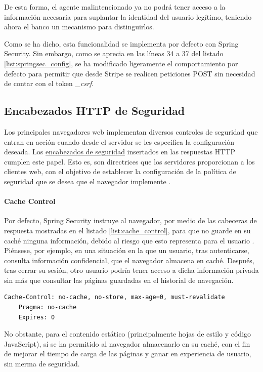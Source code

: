\documentclass[a4paper,12pt,twoside,openright]{report}
\begin{document}
	De esta forma, el agente malintencionado ya no podrá tener acceso a la información necesaria para suplantar la identidad del usuario legítimo, teniendo ahora el banco un mecanismo para distinguirlos.
	
	Como se ha dicho, esta funcionalidad se implementa por defecto con Spring Security. Sin embargo, como se aprecia en las líneas 34 a 37 del listado \ref{list:springsec_config}, se ha modificado ligeramente el comportamiento por defecto para permitir que desde Stripe se realicen peticiones POST sin necesidad de contar con el token \emph{\_csrf}.
	
	\subsection{Encabezados HTTP de Seguridad}
	Los principales navegadores web implementan diversos controles de seguridad que entran en acción cuando desde el servidor se les especifica la configuración deseada. Los \href{https://owasp.org/www-project-secure-headers/}{encabezados de seguridad} insertados en las respuestas HTTP cumplen este papel. Esto es, son directrices que los servidores proporcionan a los clientes web, con el objetivo de establecer la configuración de la política de seguridad que se desea que el navegador implemente \cite{Barnett2018}.
	
	\paragraph{Cache Control}
	Por defecto, Spring Security instruye al navegador, por medio de las cabeceras de respuesta mostradas en el listado \ref{list:cache_control}, para que no guarde en su caché ninguna información, debido al riesgo que esto representa para el usuario \cite{Alex2020}. Piénsese, por ejemplo, en una situación en la que un usuario, tras autenticarse, consulta información confidencial, que el navegador almacena en caché. Después, tras cerrar su sesión, otro usuario podría tener acceso a dicha información privada sin más que consultar las páginas guardadas en el historial de navegación.
	\\
	
	\begin{lstlisting}[caption=Cabeceras para impedir el almacenamiento en caché, label=list:cache_control]
	Cache-Control: no-cache, no-store, max-age=0, must-revalidate 
	Pragma: no-cache
	Expires: 0
	\end{lstlisting}
	
	No obstante, para el contenido estático (principalmente hojas de estilo y código JavaScript), sí se ha permitido al navegador almacenarlo en su caché, con el fin de mejorar el tiempo de carga de las páginas y ganar en experiencia de usuario, sin merma de seguridad.
\end{document}
